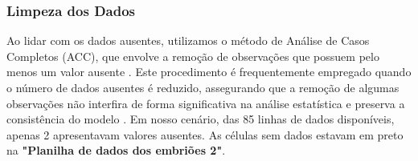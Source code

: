 \subsubsection{Limpeza dos Dados}
Ao lidar com os dados ausentes, utilizamos o método de Análise de Casos Completos (ACC), que envolve a remoção de observações que possuem pelo menos um valor ausente \cite{camargos2011}. Este procedimento é frequentemente empregado quando o número de dados ausentes é reduzido, assegurando que a remoção de algumas observações não interfira de forma significativa na análise estatística e preserva a consistência do modelo \cite{camargos2011}. Em nosso cenário, das 85 linhas de dados disponíveis, apenas 2 apresentavam valores ausentes. As células sem dados estavam em preto na \textbf{"Planilha de dados dos embriões 2"}. 




